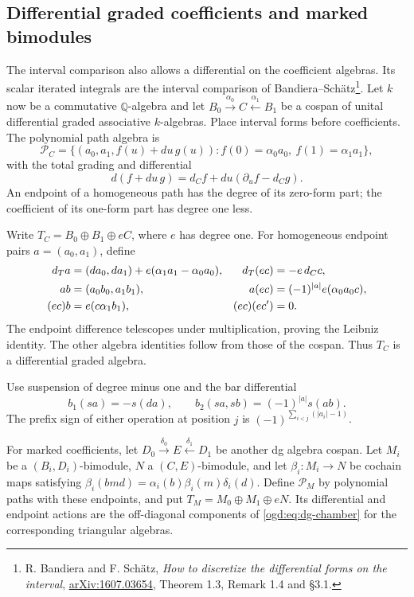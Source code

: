 \subsection{Differential graded coefficients and marked bimodules}

The interval comparison also allows a differential on the coefficient
algebras. Its scalar iterated integrals are the interval comparison
of Bandiera--Sch\"atz\footnote{R. Bandiera and F. Sch\"atz,
\emph{How to discretize the differential forms on the interval},
\href{https://arxiv.org/abs/1607.03654}{arXiv:1607.03654},
Theorem 1.3, Remark 1.4 and \S3.1.}.
Let \(k\) now be a commutative \(\mathbb Q\)-algebra and
let \(B_0\xrightarrow{\alpha_0}C\xleftarrow{\alpha_1}B_1\)
be a cospan of unital differential graded associative \(k\)-algebras.
Place interval forms before coefficients. The polynomial path algebra is
\[
 \mathcal P_C=
 \{(a_0,a_1,f(u)+du\,g(u)):
       f(0)=\alpha_0a_0,\ f(1)=\alpha_1a_1\},
\]
with the total grading and differential
\[
 d(f+du\,g)=d_Cf+du(\partial_uf-d_Cg).
\]
An endpoint of a homogeneous path has the degree of its zero-form part;
the coefficient of its one-form part has degree one less.

Write \(T_C=B_0\oplus B_1\oplus eC\), where \(e\) has degree one.
For homogeneous endpoint pairs \(a=(a_0,a_1)\), define
\begin{align}
 d_Ta&=(d a_0,d a_1)+e(\alpha_1a_1-\alpha_0a_0),&
 d_T(ec)&=-e\,d_Cc,\notag\\
 ab&=(a_0b_0,a_1b_1),&
 a(ec)&=(-1)^{|a|}e(\alpha_0a_0c),\label{ogd:eq:dg-chamber}\\
 (ec)b&=e(c\alpha_1b_1),&
 (ec)(ec')&=0.\notag
\end{align}
The endpoint difference telescopes under multiplication, proving the
Leibniz identity. The other algebra identities follow from those of the
cospan. Thus \(T_C\) is a differential graded algebra.

Use suspension of degree minus one and the bar differential
\[
 b_1(sa)=-s(da),\qquad b_2(sa,sb)=(-1)^{|a|}s(ab).
\]
The prefix sign of either operation at position \(j\) is
\((-1)^{\sum_{i<j}(|a_i|-1)}\).

For marked coefficients, let
\(D_0\xrightarrow{\delta_0}E\xleftarrow{\delta_1}D_1\)
be another dg algebra cospan. Let \(M_i\) be a
\((B_i,D_i)\)-bimodule, \(N\) a \((C,E)\)-bimodule,
and let \(\beta_i:M_i\to N\) be cochain maps satisfying
\(\beta_i(bmd)=\alpha_i(b)\beta_i(m)\delta_i(d)\).
Define \(\mathcal P_M\) by polynomial paths with these endpoints,
and put \(T_M=M_0\oplus M_1\oplus eN\). Its differential and
endpoint actions are the off-diagonal components of
\eqref{ogd:eq:dg-chamber} for the corresponding triangular algebras.

